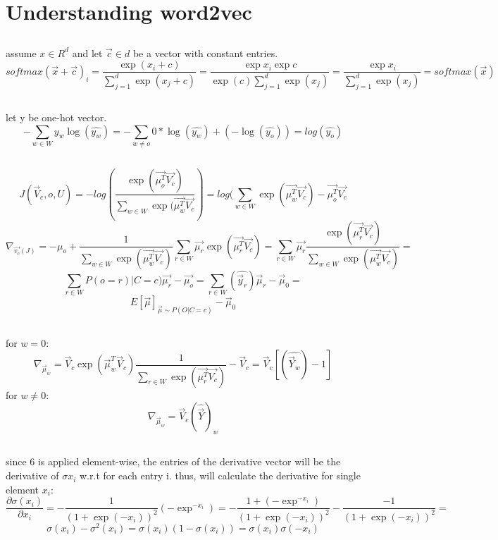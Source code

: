 \documentclass{article}
\begin{document}

\section{Understanding word2vec}
\subsection{}
assume $ x \in R^d$ and let $\vec{c}\in d$ be a vector with constant entries. 
\[
softmax(\vec{x} + \vec{c})_i =
\frac{\exp{(x_i+c)}}{\sum_{j=1}^{d}\exp{(x_j+c)}} =
\frac{\exp{x_i}\exp{c}}{\exp(c)\sum_{j=1}^{d}\exp{(x_j)}} =
\frac{\exp{x_i}}{\sum_{j=1}^{d}\exp{(x_j)}} =
softmax(\vec{x})
\]

\subsection{}
let y be one-hot vector.
\[
-\sum_{w \in W}y_w\log(\hat{y_w}) = 
-\sum_{w \neq o} 0*\log(\hat{y_w}) + (-\log(\hat{y_o})) =
log(\hat{y_o})
\]

\subsection{}
\[
J(\vec{V}_c, o, U) =
 -log(\frac {\exp(\vec{\mu_o^T}\vec{V_c})} {\sum_{w \in W}\exp(\vec{\mu_w^T}\vec{V_c}}) =
 log({\sum_{w \in W}\exp(\vec{\mu_w^T}\vec{V_c})} -  \vec{\mu_o^T}\vec{V_c}
\]
\[
\nabla_{\vec{v_c}(J)} = -\mu_o + \frac {1} {\sum_{w \in W}\exp(\vec{\mu_w^T}\vec{V_c})}  \sum_{r \in W}\vec{\mu_r}\exp(\vec{\mu_r^T}\vec{V_c}) = 
 \sum_{r \in W} \vec{\mu_r} \frac {\exp(\vec{\mu_r^T}\vec{V_c})} {\sum_{w \in W}\exp(\vec{\mu_w^T}\vec{V_c})} = 
\]
\[
 \sum_{r \in W} P(o=r) | C=c) \vec{\mu_r} - \vec{\mu_o} =
 \sum_{r \in W} (\hat{\vec y_r})\vec\mu_r - \vec\mu_0 = 
\]
\[
E[\vec\mu]_{\vec\mu \sim P(O|C=c)}-\vec\mu_0
\]

\subsection{}
for $w=0$:
\[
\nabla_{\vec\mu_w} = \vec V_c\exp(\vec\mu_w^T\vec V_c) \frac {1} {\sum_{r \in W}\exp(\vec{\mu_r^T}\vec{V_c})} - \vec V_c =
\vec V_c [(\hat{\vec Y_w}) - 1]
\]
for $w\neq 0$:
\[
\nabla_{\vec\mu_w} = \vec V_c (\hat{\vec Y})_w
\]
\subsection{}
since 6 is applied element-wise, the entries of the derivative vector will be the derivative of $\sigma x_i$ w.r.t for each entry i.
thus, will calculate the derivative for single element $x_i$:
\[
\frac {\partial\sigma(x_i)}{\partial x_i} = -\frac {1} {(1+\exp(-x_i))^2} (-\exp^{-x_i}) =  -\frac {1+(-\exp^{-x_i})} {(1+\exp(-x_i))^2} -\frac {-1} {(1+\exp(-x_i))^2}  = 
\]
\[
\sigma(x_i)-\sigma^2(x_i) = \sigma(x_i)(1-\sigma(x_i)) = \sigma(x_i)  \sigma(-x_i) 
\]
\end{document}
